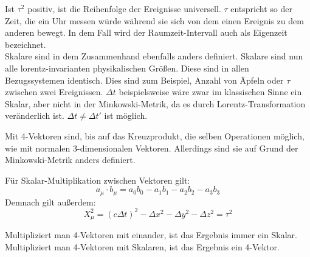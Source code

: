 \documentclass[12pt]{article}
\begin{document}
Ist $\tau^2$ positiv, ist die Reihenfolge der Ereignisse universell.
$\tau$ entspricht so der Zeit, die ein Uhr messen würde während sie sich von dem einen Ereignis zu dem anderen bewegt.
In dem Fall wird der Raumzeit-Intervall auch als Eigenzeit bezeichnet.
\\

Skalare sind in dem Zusammenhand ebenfalls anders definiert.
Skalare sind nun alle lorentz-invarianten physikalischen Größen.
Diese sind in allen Bezugssystemen identisch.
Dies sind zum Beispiel, Anzahl von Äpfeln oder $\tau$ zwischen zwei Ereignissen.
$\Delta t$ beispielsweise wäre zwar im klassischen Sinne ein Skalar, aber nicht in der Minkowski-Metrik, da es durch Lorentz-Transformation veränderlich ist.
$\Delta t\neq \Delta t'$ ist möglich.

Mit 4-Vektoren sind, bis auf das Kreuzprodukt, die selben Operationen möglich, wie mit normalen 3-dimensionalen Vektoren.
Allerdings sind sie auf Grund der Minkowski-Metrik anders definiert.


Für Skalar-Multiplikation zwischen Vektoren gilt:
\begin{equation}
	a_\mu \cdot b_\mu = a_0 b_0 - a_1 b_1 - a_2 b_2 - a_3 b_3
\end{equation}
Demnach gilt außerdem:
\begin{equation}
X_\mu ^2 = (c\Delta t)^2 - \Delta x^2 - \Delta y^2 - \Delta z^2 = \tau^2
\end{equation}

Multipliziert man 4-Vektoren mit einander, ist das Ergebnis immer ein Skalar.
Multipliziert man 4-Vektoren mit Skalaren, ist das Ergebnis ein 4-Vektor.
\end{document}
